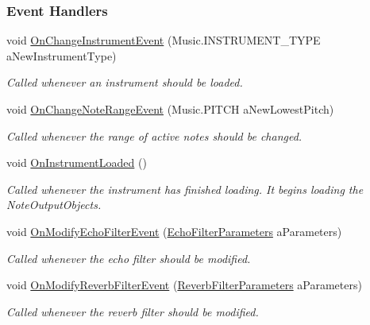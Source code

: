 \subsubsection*{Event Handlers}
\begin{DoxyCompactItemize}
\item 
void \hyperlink{group___virtual_instrument_manager_a8e79286073756c31e08fecd59ce04fa7}{On\+Change\+Instrument\+Event} (Music.\+I\+N\+S\+T\+R\+U\+M\+E\+N\+T\+\_\+\+T\+Y\+PE a\+New\+Instrument\+Type)
\begin{DoxyCompactList}\small\item\em Called whenever an instrument should be loaded. \end{DoxyCompactList}\item 
void \hyperlink{group___virtual_instrument_manager_a660c766dceebfc830de2cf96686692df}{On\+Change\+Note\+Range\+Event} (Music.\+P\+I\+T\+CH a\+New\+Lowest\+Pitch)
\begin{DoxyCompactList}\small\item\em Called whenever the range of active notes should be changed. \end{DoxyCompactList}\item 
void \hyperlink{group___virtual_instrument_manager_ac7d5b65484e450a400e32ab416ebc9f6}{On\+Instrument\+Loaded} ()
\begin{DoxyCompactList}\small\item\em Called whenever the instrument has finished loading. It begins loading the Note\+Output\+Objects. \end{DoxyCompactList}\item 
void \hyperlink{group___virtual_instrument_manager_ae504c6ded8eb68ffb117c207fc25d99d}{On\+Modify\+Echo\+Filter\+Event} (\hyperlink{group___virtual_instrument_manager_struct_virtual_instrument_manager_1_1_echo_filter_parameters}{Echo\+Filter\+Parameters} a\+Parameters)
\begin{DoxyCompactList}\small\item\em Called whenever the echo filter should be modified. \end{DoxyCompactList}\item 
void \hyperlink{group___virtual_instrument_manager_a2b310217971075b1b2db67d68fbbea5a}{On\+Modify\+Reverb\+Filter\+Event} (\hyperlink{group___virtual_instrument_manager_struct_virtual_instrument_manager_1_1_reverb_filter_parameters}{Reverb\+Filter\+Parameters} a\+Parameters)
\begin{DoxyCompactList}\small\item\em Called whenever the reverb filter should be modified. \end{DoxyCompactList}\item 

\end{DoxyCompactItemize}
